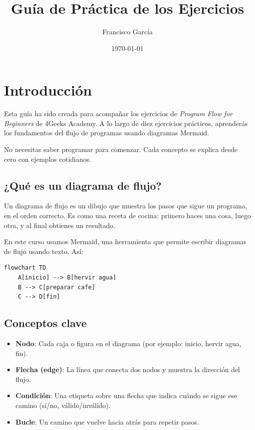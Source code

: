 \documentclass[12pt]{article}
\title{Guía de Práctica de los Ejercicios}
\author{Francisco García}
\date{\today}
\begin{document}
\maketitle
\tableofcontents
\newpage

\section{Introducción}

Esta guía ha sido creada para acompañar los ejercicios de \textit{Program Flow for Beginners} de 4Geeks Academy. A lo largo de diez ejercicios prácticos, aprenderás los fundamentos del flujo de programas usando diagramas Mermaid.

No necesitas saber programar para comenzar. Cada concepto se explica desde cero con ejemplos cotidianos.

\subsection{¿Qué es un diagrama de flujo?}

Un diagrama de flujo es un dibujo que muestra los pasos que sigue un programa, en el orden correcto. Es como una receta de cocina: primero haces una cosa, luego otra, y al final obtienes un resultado.

En este curso usamos Mermaid, una herramienta que permite escribir diagramas de flujo usando texto. Así:

\begin{lstlisting}[style=mermaidstyle]
flowchart TD
    A[inicio] --> B[hervir agua]
    B --> C[preparar cafe]
    C --> D[fin]
\end{lstlisting}

\subsection{Conceptos clave}

\begin{itemize}
    \item \textbf{Nodo}: Cada caja o figura en el diagrama (por ejemplo: inicio, hervir agua, fin).
    \item \textbf{Flecha (edge)}: La línea que conecta dos nodos y muestra la dirección del flujo.
    \item \textbf{Condición}: Una etiqueta sobre una flecha que indica cuándo se sigue ese camino (sí/no, válido/inválido).
    \item \textbf{Bucle}: Un camino que vuelve hacia atrás para repetir pasos.
\end{itemize}
\end{document}
